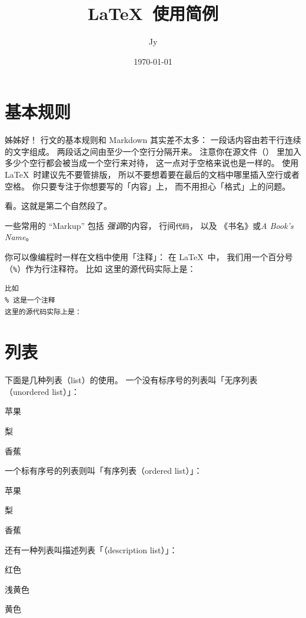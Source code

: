 \documentclass{article}
\title{\LaTeX\ 使用简例}
\author{Jy}
\date{\today}
\renewenvironment{itemize}{%
    \begin{compactitem}
}{%
    \end{compactitem}
}
\renewenvironment{enumerate}{%
    \begin{compactenum}
}{%
    \end{compactenum}
}
\renewenvironment{description}{%
    \begin{compactdesc}
}{%
    \end{compactdesc}
}
\def\code{\lstinline}
\newcommand*\propername[1]{\textit{#1}}
\newcommand*\propernameZH[1]{《#1》}
\begin{document}
\maketitle %


\section{基本规则}

姊姊好！
行文的基本规则和 Markdown 其实差不太多：
一段话内容由若干行连续的文字组成。
两段话之间由至少一个空行分隔开来。
注意你在源文件（）
里加入多少个空行都会被当成一个空行来对待，
这一点对于空格来说也是一样的。
使用 \LaTeX\ 时建议先不要管排版，
所以不要想着要在最后的文档中哪里插入空行或者空格。
你只要专注于你想要写的「内容」上，
而不用担心「格式」上的问题。

看。这就是第二个自然段了。

一些常用的 ``Markup'' 包括%
    \emph{强调}的内容，
    行间\code`代码`，
    以及
    \propernameZH{书名}或\propername{A Book's Name}。

你可以像编程时一样在文档中使用「注释」：
在 \LaTeX\ 中，
我们用一个百分号（\code`%
比如
这里的源代码实际上是：
\begin{lstlisting}[language={[LaTeX]TeX}]
比如
% 这是一个注释
这里的源代码实际上是：
\end{lstlisting}

\section{列表}

下面是几种列表（list）的使用。
一个没有标序号的列表叫「无序列表（unordered list）」：
\begin{itemize}
\item
    苹果
\item
    梨
\item
    香蕉
\end{itemize}
一个标有序号的列表则叫「有序列表（ordered list）」：
\begin{enumerate}
\item
    苹果
\item
    梨
\item
    香蕉
\end{enumerate}
还有一种列表叫描述列表「（description list）」：
\begin{description}
\item[苹果]
    红色
\item[梨]
    浅黄色
\item[香蕉]
    黄色
\end{description}
\end{document}
